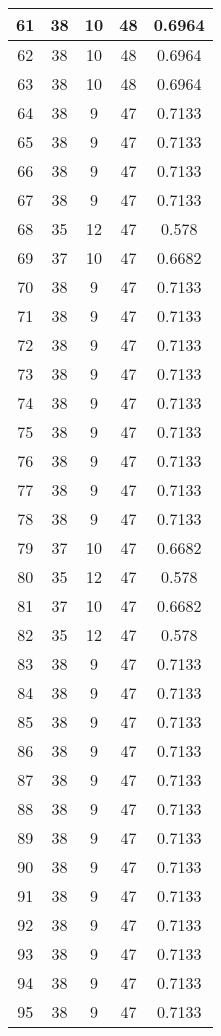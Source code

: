 \documentclass[letterpaper, 12pt]{article}
\begin{document}
\begin{longtable}{|c|c|c|c|c|}
\hline
61 & 38 & 10 & 48 & 0.6964 \\
\hline
62 & 38 & 10 & 48 & 0.6964 \\
\hline
63 & 38 & 10 & 48 & 0.6964 \\
\hline
64 & 38 & 9 & 47 & 0.7133 \\
\hline
65 & 38 & 9 & 47 & 0.7133 \\
\hline
66 & 38 & 9 & 47 & 0.7133 \\
\hline
67 & 38 & 9 & 47 & 0.7133 \\
\hline
68 & 35 & 12 & 47 & 0.578 \\
\hline
69 & 37 & 10 & 47 & 0.6682 \\
\hline
70 & 38 & 9 & 47 & 0.7133 \\
\hline
71 & 38 & 9 & 47 & 0.7133 \\
\hline
72 & 38 & 9 & 47 & 0.7133 \\
\hline
73 & 38 & 9 & 47 & 0.7133 \\
\hline
74 & 38 & 9 & 47 & 0.7133 \\
\hline
75 & 38 & 9 & 47 & 0.7133 \\
\hline
76 & 38 & 9 & 47 & 0.7133 \\
\hline
77 & 38 & 9 & 47 & 0.7133 \\
\hline
78 & 38 & 9 & 47 & 0.7133 \\
\hline
79 & 37 & 10 & 47 & 0.6682 \\
\hline
80 & 35 & 12 & 47 & 0.578 \\
\hline
81 & 37 & 10 & 47 & 0.6682 \\
\hline
82 & 35 & 12 & 47 & 0.578 \\
\hline
83 & 38 & 9 & 47 & 0.7133 \\
\hline
84 & 38 & 9 & 47 & 0.7133 \\
\hline
85 & 38 & 9 & 47 & 0.7133 \\
\hline
86 & 38 & 9 & 47 & 0.7133 \\
\hline
87 & 38 & 9 & 47 & 0.7133 \\
\hline
88 & 38 & 9 & 47 & 0.7133 \\
\hline
89 & 38 & 9 & 47 & 0.7133 \\
\hline
90 & 38 & 9 & 47 & 0.7133 \\
\hline
91 & 38 & 9 & 47 & 0.7133 \\
\hline
92 & 38 & 9 & 47 & 0.7133 \\
\hline
93 & 38 & 9 & 47 & 0.7133 \\
\hline
94 & 38 & 9 & 47 & 0.7133 \\
\hline
95 & 38 & 9 & 47 & 0.7133 \\

\end{longtable}
\end{document}
